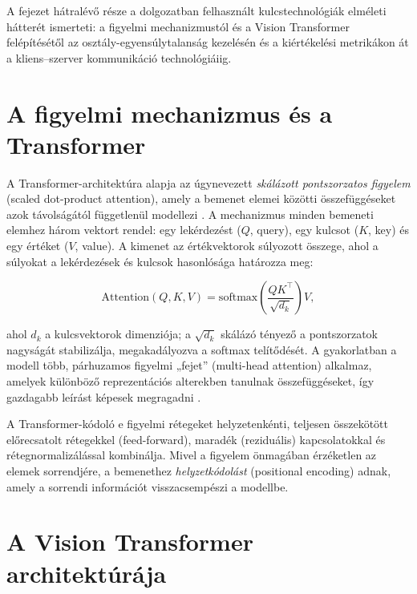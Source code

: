 A fejezet hátralévő része a dolgozatban felhasznált kulcstechnológiák elméleti
hátterét ismerteti: a figyelmi mechanizmustól és a Vision Transformer
felépítésétől az osztály-egyensúlytalanság kezelésén és a kiértékelési
metrikákon át a kliens--szerver kommunikáció technológiáiig.

\section{A figyelmi mechanizmus és a Transformer}

A Transformer-architektúra alapja az úgynevezett \textit{skálázott pontszorzatos
figyelem} (scaled dot-product attention), amely a bemenet elemei közötti
összefüggéseket azok távolságától függetlenül modellezi \cite{vaswani2017attention}.
A mechanizmus minden bemeneti elemhez három vektort rendel: egy lekérdezést
($Q$, query), egy kulcsot ($K$, key) és egy értéket ($V$, value). A kimenet az
értékvektorok súlyozott összege, ahol a súlyokat a lekérdezések és kulcsok
hasonlósága határozza meg:

\begin{equation}
  \mathrm{Attention}(Q, K, V) = \mathrm{softmax}\!\left(\frac{QK^{\top}}{\sqrt{d_k}}\right) V,
  \label{eq:attention}
\end{equation}

ahol $d_k$ a kulcsvektorok dimenziója; a $\sqrt{d_k}$ skálázó tényező a
pontszorzatok nagyságát stabilizálja, megakadályozva a softmax telítődését. A
gyakorlatban a modell több, párhuzamos figyelmi „fejet'' (multi-head attention)
alkalmaz, amelyek különböző reprezentációs alterekben tanulnak összefüggéseket,
így gazdagabb leírást képesek megragadni \cite{vaswani2017attention}.

A Transformer-kódoló e figyelmi rétegeket helyzetenkénti, teljesen összekötött
előrecsatolt rétegekkel (feed-forward), maradék (reziduális) kapcsolatokkal és
rétegnormalizálással kombinálja. Mivel a figyelem önmagában érzéketlen az elemek
sorrendjére, a bemenethez \textit{helyzetkódolást} (positional encoding) adnak,
amely a sorrendi információt visszacsempészi a modellbe.

\section{A Vision Transformer architektúrája}

